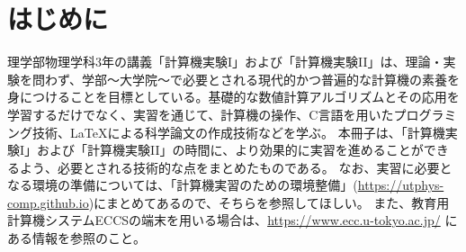\section*{はじめに}

\noindent
理学部物理学科3年の講義「計算機実験I」および「計算機実験II」は、理論・実験を問わず、学部〜大学院〜で必要とされる現代的かつ普遍的な計算機の素養を身につけることを目標としている。基礎的な数値計算アルゴリズムとその応用を学習するだけでなく、実習を通じて、計算機の操作、C言語を用いたプログラミング技術、\LaTeX による科学論文の作成技術などを学ぶ。
本冊子は、「計算機実験I」および「計算機実験II」の時間に、より効果的に実習を進めることができるよう、必要とされる技術的な点をまとめたものである。
なお、実習に必要となる環境の準備については、「計算機実習のための環境整備」(\url{https://utphys-comp.github.io})にまとめてあるので、そちらを参照してほしい。
また、教育用計算機システムECCSの端末を用いる場合は、\url{https://www.ecc.u-tokyo.ac.jp/} にある情報を参照のこと。
